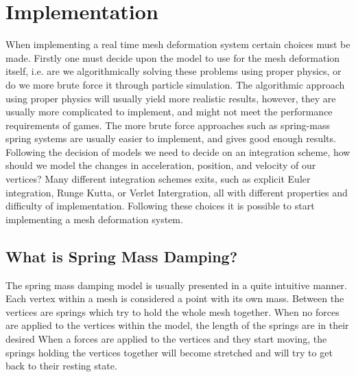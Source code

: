 \chapter{Implementation}
\label{chap:implementation}
When implementing a real time mesh deformation system certain choices must be made.
Firstly one must decide upon the model to use for the mesh deformation itself, i.e. are we algorithmically solving these problems using proper physics, or do we more brute force it through particle simulation. The algorithmic approach using proper physics will usually yield more realistic results, however, they are usually more complicated to implement,
and might not meet the performance requirements of games. The more brute force approaches such as spring-mass spring systems are usually easier to implement,
and gives good enough results.
Following the decision of models we need to decide on an integration scheme, how should we model the changes in acceleration, position, and velocity of our vertices?
Many different integration schemes exits, such as explicit Euler integration, Runge Kutta, or Verlet Intergration, all with different properties and difficulty of implementation.
Following these choices it is possible to start implementing a mesh deformation system.


\section{What is Spring Mass Damping?}
The spring mass damping model is usually presented in a quite intuitive manner.
Each vertex within a mesh is considered a point with its own mass.
Between the vertices are springs which try to hold the whole mesh together.
When no forces are applied to the vertices within the model, the length of the springs are in their desired 
When a forces are applied to the vertices and they start moving, the springs holding the vertices together will become stretched
and will try to get back to their resting state.


